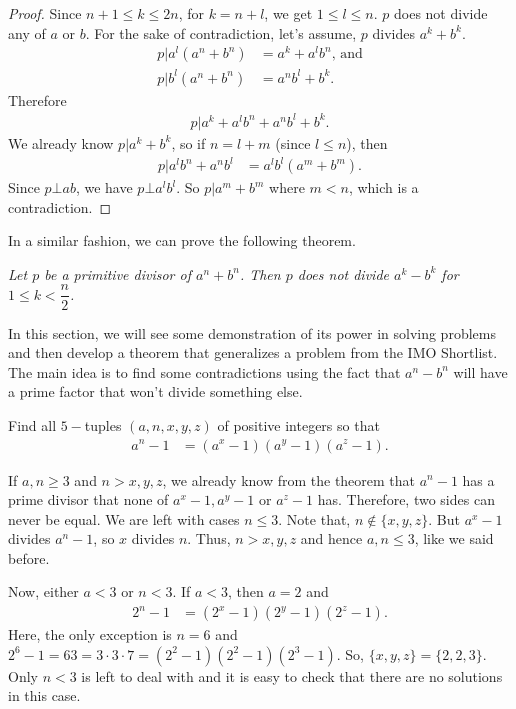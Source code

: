 \documentclass{subfile}
\begin{document}
		\begin{proof}
			Since $n+1\leq k\leq2n$, for $k=n+l$, we get $1\leq l\leq n$. $p$ does not divide any of $a$ or $b$. For the sake of contradiction, let's assume, $p$ divides $a^k+b^k$.
				\begin{align*}
					p | a^l(a^n+b^n) &= a^k+a^lb^n\text {, and}\\
					p |b^l(a^n+b^n) &= a^nb^l+b^k.
				\end{align*}
			Therefore
			\begin{align*}
				p |a^k+a^lb^n+a^nb^l+b^k.
			\end{align*}
			We already know $p|a^k+b^k$, so if $n=l+m$ (since $l\leq n$), then
				\begin{align*}
					p|a^lb^n+a^nb^l & = a^lb^l(a^m+b^m).
				\end{align*}
			Since $p\bot ab$, we have $p\bot a^lb^l$. So $p|a^m+b^m$ where $m< n$, which is a contradiction.
		\end{proof}
	In a similar fashion, we can prove the following theorem.
		\begin{theorem}\slshape
			Let $p$ be a primitive divisor of $a^n+b^n$. Then $p$ does not divide $a^k-b^k$ for $1\leq k<\dfrac{n}{2}$.
		\end{theorem}
		
	In this section, we will see some demonstration of its power in solving problems and then develop a theorem that generalizes a problem from the IMO Shortlist. The main idea is to find some contradictions using the fact that $a^n-b^n$ will have a prime factor that won't divide something else.
		\begin{problem}
			Find all $5-$tuples $(a,n,x,y,z)$ of positive integers so that
				\begin{align*}
					a^n-1 & = (a^x-1)(a^y-1)(a^z-1).
				\end{align*}
		\end{problem}
		
		\begin{solution}
			If $a,n\geq3$ and $n>x,y,z$, we already know from the theorem that $a^n-1$ has a prime divisor that none of $a^x-1,a^y-1$ or $a^z-1$ has. Therefore, two sides can never be equal. We are left with cases $n\leq3$. Note that, $n\notin\{x,y,z\}$. But $a^x-1$ divides $a^n-1$, so $x$ divides $n$. Thus, $n>x,y,z$ and hence $a,n\leq3$, like we said before.
			
			Now, either $a<3$ or $n<3$. If $a<3$, then $a=2$ and
				\begin{align*}
					2^n-1 & = (2^x-1)(2^y-1)(2^z-1).
				\end{align*}
			Here, the only exception is $n=6$ and $2^6-1=63=3\cdot3\cdot7=(2^2-1)(2^2-1)(2^3-1)$. So, $\{x,y,z\}=\{2,2,3\}$. Only $n<3$ is left to deal with and it is easy to check that there are no solutions in this case.
		\end{solution}
		
\end{document}
